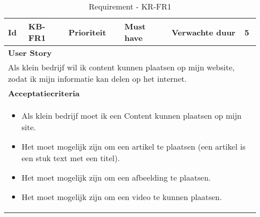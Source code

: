 \begin{table}[!ht]
	\caption{Requirement - KR-FR1}
	\label{rq:res5Sample}
	\begin{tabularx}{\textwidth}{|m{0.5cm}|l|m{2.0cm}|l|m{3.5cm}|l|}
		\hline
		\textbf{Id} & KB-FR1 & \textbf{Prioriteit} & Must have & \textbf{Verwachte duur} & 5                                                                                                         \\
		\hline
		\multicolumn{6}{|p{\dimexpr\linewidth-2\arrayrulewidth-2\tabcolsep}|}{\textbf{User Story}}                                                                                                   \\
		\hline
		\multicolumn{6}{|p{\dimexpr\linewidth-2\arrayrulewidth-2\tabcolsep}|}{Als klein bedrijf wil ik content kunnen plaatsen op mijn website, zodat ik mijn informatie kan delen op het internet.} \\
		\hline
		\hline
		\multicolumn{6}{|p{\dimexpr\linewidth-2\arrayrulewidth-2\tabcolsep}|}{\textbf{Acceptatiecriteria}}                                                                                           \\
		\hline
		\multicolumn{6}{|p{\dimexpr\linewidth-2\arrayrulewidth-2\tabcolsep}|}{
		\begin{itemize}
			\item{Als klein bedrijf moet ik een Content kunnen plaatsen op mijn site.}
			\item{Het moet mogelijk zijn om een artikel te plaatsen (een artikel is een stuk text met een titel).}
			\item{Het moet mogelijk zijn om een afbeelding te plaatsen.}
			\item{Het moet mogelijk zijn om een video te kunnen plaatsen.}
		\end{itemize}}                                                                                        \\
		\hline
	\end{tabularx}
\end{table}
